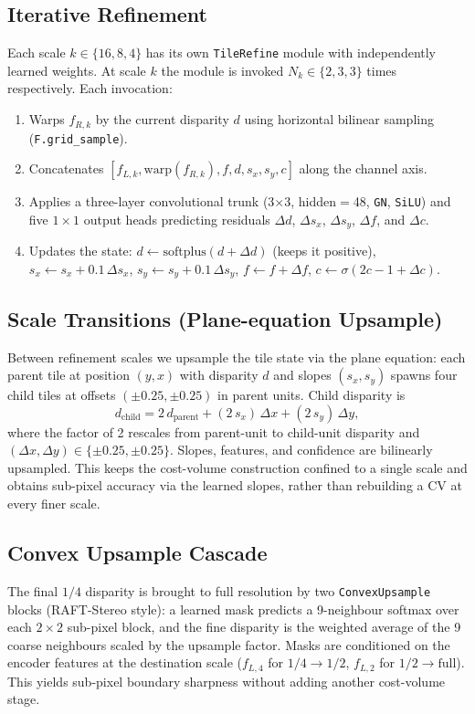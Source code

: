 \documentclass[11pt,a4paper]{article}
\begin{document}
\subsection{Iterative Refinement}
Each scale $k \in \{16, 8, 4\}$ has its own \texttt{TileRefine} module
with independently learned weights. At scale $k$ the module is invoked
$N_k \in \{2, 3, 3\}$ times respectively. Each invocation:
\begin{enumerate}[leftmargin=*, topsep=2pt, itemsep=1pt]
  \item Warps $f_{R,k}$ by the current disparity $d$ using horizontal
    bilinear sampling (\texttt{F.grid\_sample}).
  \item Concatenates $[f_{L,k}, \text{warp}(f_{R,k}), f, d, s_x, s_y, c]$
    along the channel axis.
  \item Applies a three-layer convolutional trunk (3$\times$3,
    hidden$=$48, \texttt{GN}, \texttt{SiLU}) and five $1\times 1$ output
    heads predicting residuals $\Delta d$, $\Delta s_x$, $\Delta s_y$,
    $\Delta f$, and $\Delta c$.
  \item Updates the state:
    $d \leftarrow \mathrm{softplus}(d + \Delta d)$ (keeps it positive),
    $s_x \leftarrow s_x + 0.1\,\Delta s_x$,
    $s_y \leftarrow s_y + 0.1\,\Delta s_y$,
    $f \leftarrow f + \Delta f$,
    $c \leftarrow \sigma(2c - 1 + \Delta c)$.
\end{enumerate}

\subsection{Scale Transitions (Plane-equation Upsample)}
Between refinement scales we upsample the tile state via the plane
equation: each parent tile at position $(y, x)$ with disparity $d$ and
slopes $(s_x, s_y)$ spawns four child tiles at offsets
$(\pm 0.25, \pm 0.25)$ in parent units. Child disparity is
\[
  d_\text{child} = 2\,d_\text{parent}
    + (2\,s_x)\,\Delta x + (2\,s_y)\,\Delta y,
\]
where the factor of 2 rescales from parent-unit to child-unit
disparity and $(\Delta x, \Delta y) \in \{\pm 0.25, \pm 0.25\}$. Slopes,
features, and confidence are bilinearly upsampled. This keeps the
cost-volume construction confined to a single scale and obtains sub-pixel
accuracy via the learned slopes, rather than rebuilding a CV at every
finer scale.

\subsection{Convex Upsample Cascade}
The final $1/4$ disparity is brought to full resolution by two
\texttt{ConvexUpsample} blocks (RAFT-Stereo style): a learned mask
predicts a 9-neighbour softmax over each $2\times 2$ sub-pixel block, and
the fine disparity is the weighted average of the 9 coarse neighbours
scaled by the upsample factor. Masks are conditioned on the encoder
features at the destination scale ($f_{L,4}$ for $1/4 \rightarrow 1/2$,
$f_{L,2}$ for $1/2 \rightarrow \text{full}$). This yields sub-pixel
boundary sharpness without adding another cost-volume stage.
\end{document}
